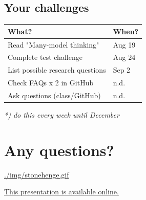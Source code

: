 \documentclass[11pt]{article}
\begin{document}
\subsection*{Your challenges}
\label{sec:org32aa7ce}

\begin{center}
\begin{tabular}{ll}
What? & When?\\
\hline
Read "Many-model thinking" & Aug 19\\
Complete test challenge & Aug 24\\
List possible research questions & Sep 2\\
Check FAQs x 2 in GitHub & n.d.\\
Ask questions (class/GitHub) & n.d.\\
\end{tabular}
\end{center}

\emph{*) do this every week until December}

\section*{Any questions?}
\label{sec:orgf4c9c54}

\url{./img/stonehenge.gif}

\href{https://github.com/birkenkrahe/dsc101/tree/main/1\_overview}{This presentation is available online.}
\end{document}
